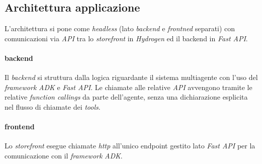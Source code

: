 \subsection{Architettura applicazione}

L'architettura si pone come \emph{headless} (lato \emph{backend} e \emph{frontned} separati) con comunicazioni via \emph{API} tra lo \emph{storefront} in \emph{Hydrogen} 
ed il backend in \emph{Fast API}.

\paragraph{\textbf{backend}}
Il \emph{backend} si struttura dalla logica riguardante il sistema multiagente con l'uso del \emph{framework} \emph{ADK} e \emph{Fast API}.
Le chiamate alle relative \emph{API} avvengono tramite le relative \emph{function callings} da parte dell'agente, senza una dichiarazione esplicita nel flusso di chiamate dei \emph{tools}.


\paragraph{\textbf{frontend}}
Lo \emph{storefront} esegue chiamate \emph{http} all'unico endpoint gestito lato \emph{Fast API} per la comunicazione con il \emph{framework} \emph{ADK}.

